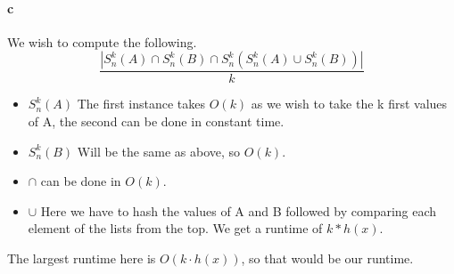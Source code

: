 \paragraph{c}
We wish to compute the following.
\begin{equation*}
    \frac{|S^{k}_{n}(A) \cap S^{k}_{n}(B) \cap S^{k}_{n}(S^{k}_{n}(A) \cup S^{k}_{n}(B))|}{k}
\end{equation*}
\begin{itemize}
    \item{$S^{k}_{n}(A)$} The first instance takes $O(k)$ as we wish to take the k first values of A, the second can be done in constant time.
    \item{$S^{k}_{n}(B)$} Will be the same as above, so $O(k)$.
    \item{$\cap$} can be done in $O(k)$. 
    \item{$\cup$} Here we have to hash the values of A and B followed by comparing each element of the lists from the top. We get a runtime of $k * h(x)$.
\end{itemize}
The largest runtime here is $O(k \cdot h(x))$, so that would be our runtime.
